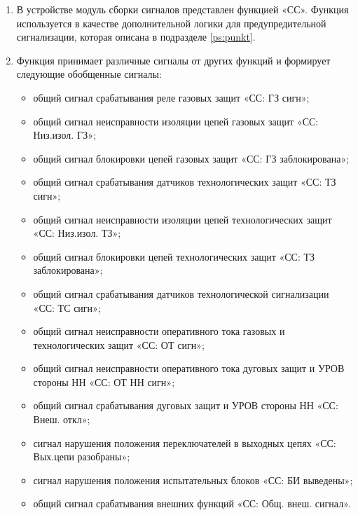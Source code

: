 
\color{black}

\begin{enumerate}

\item
В устройстве модуль сборки сигналов представлен функцией «СС». Функция используется в качестве дополнительной логики для предупредительной сигнализации, которая описана в подразделе \ref{ps:punkt}.

\item
Функция принимает различные сигналы от других функций и формирует следующие обобщенные сигналы:
\begin{itemize}
	\item общий сигнал срабатывания реле газовых защит «СС: ГЗ сигн»;
	\item общий сигнал неисправности изоляции цепей газовых защит «СС: Низ.изол. ГЗ»;
	\item общий сигнал блокировки цепей газовых защит «СС: ГЗ заблокирована»;
	\item общий сигнал срабатывания датчиков технологических защит «СС: ТЗ сигн»;
	\item общий сигнал неисправности изоляции цепей технологических защит «СС: Низ.изол. ТЗ»;
	\item общий сигнал блокировки цепей технологических защит «СС: ТЗ заблокирована»;	
	\item общий сигнал срабатывания датчиков технологической сигнализации «СС: ТС сигн»;
	\item общий сигнал неисправности оперативного тока газовых и технологических защит «СС: ОТ сигн»;	
	\item общий сигнал неисправности оперативного тока дуговых защит и УРОВ стороны НН «СС: ОТ НН сигн»;
	\item общий сигнал срабатывания дуговых защит и УРОВ стороны НН «СС: Внеш. откл»;
	\item сигнал нарушения положения переключателей в выходных цепях  «СС: Вых.цепи разобраны»;
	\item сигнал нарушения положения испытательных блоков «СС: БИ выведены»;
	\item общий сигнал срабатывания внешних функций «СС: Общ. внеш. сигнал».	
\end{itemize}


\end{enumerate}
